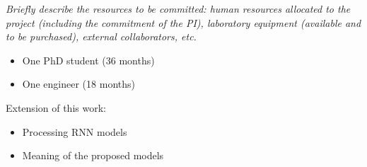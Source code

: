 \textit{Briefly describe the resources to be committed: human resources allocated to the project (including the commitment of the PI), laboratory equipment (available and to be purchased), external collaborators, etc.}

\begin{itemize}
	\item One PhD student (36 months)
	\item One engineer (18 months)
\end{itemize}

Extension of this work:
\begin{itemize}
	\item Processing RNN models
	\item Meaning of the proposed models
\end{itemize}




